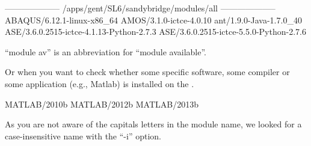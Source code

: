 \begin{prompt}
-------------------- /apps/gent/SL6/sandybridge/modules/all --------------------
ABAQUS/6.12.1-linux-x86_64
AMOS/3.1.0-ictce-4.0.10
ant/1.9.0-Java-1.7.0_40
ASE/3.6.0.2515-ictce-4.1.13-Python-2.7.3
ASE/3.6.0.2515-ictce-5.5.0-Python-2.7.6
\end{prompt}

``module av'' is an abbreviation for ``module available''.

Or when you want to check whether some specific software, some compiler or some
application (e.g., Matlab) is installed on the \hpc.

\begin{prompt}
MATLAB/2010b
MATLAB/2012b
MATLAB/2013b
\end{prompt}

As you are not aware of the capitals letters in the module name, we looked for
a case-insensitive name with the ``-i'' option.
